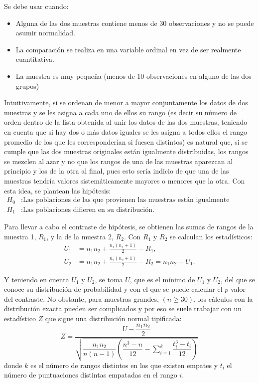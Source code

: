 \begin{description}
Se debe usar cuando:
\begin{itemize}
\item Alguna de las dos muestras contiene menos de 30 observaciones y no se puede asumir normalidad.
\item La comparación se realiza en una variable ordinal en vez de ser realmente cuantitativa.
\item La muestra es muy pequeña (menos de 10 observaciones en alguno de las dos grupos)
\end{itemize}

Intuitivamente, si se ordenan de menor a mayor conjuntamente los datos de dos muestras y se les asigna a cada uno de ellos su rango (es decir su número de orden dentro de la lista obtenida al unir los datos de las dos muestras, teniendo en cuenta que si hay dos o más datos iguales se les asigna a todos ellos el rango promedio de los que les corresponderían si fuesen distintos) es natural que, si se cumple que las dos muestras originales están igualmente distribuidas, los rangos se mezclen al azar y no que los rangos de una de las muestras aparezcan al principio y los de la otra al final, pues esto sería indicio de que una de las muestras tendría valores sistemáticamente mayores o menores que la otra. Con esta idea, se plantean las hipótesis:
\begin{align*}
H_0 &: \textrm{Las poblaciones de las que provienen las muestras están igualmente distribuidas.}\\
H_1 &: \textrm{Las poblaciones difieren en su distribución.}
\end{align*}

Para llevar a cabo el contraste de hipótesis, se obtienen las sumas de rangos de la muestra 1, $R_1$, y la de la muestra 2, $R_2$. Con $R_1$ y $R_2$ se calculan los estadísticos:
\begin{align*}
U_1  &= n_1n_2+\frac{n_1(n_1+1)}{2}-R_1,
\\
U_2  &= n_1n_2+\frac{n_2(n_2+1)}{2}-R_2= n_1n_2-U_1.
\end{align*}

Y teniendo en cuenta $U_1$ y $U_2$, se toma $U$, que es el mínimo de $U_1$ y $U_2$, del que se conoce su distribución de probabilidad y con el que se puede calcular el $p$ valor del contraste. No obstante, para muestras grandes, $(n\geq30)$, los cálculos con la distribución exacta pueden ser complicados y por eso se suele trabajar con un estadístico $Z$ que sigue una distribución normal tipificada:
\[
Z = \frac{U-\dfrac{n_1n_2}{2}}{\sqrt{\dfrac{n_1n_2}{n(n-1)}\left(\dfrac{n^3-n}{12}-\sum_{i = 1}^k \dfrac{t_i^3-t_i}{12}\right)}}
\]
donde $k$ es el número de rangos distintos en los que existen empates y $t_i$ el número de puntuaciones distintas empatadas en el rango $i$.



\end{description}

